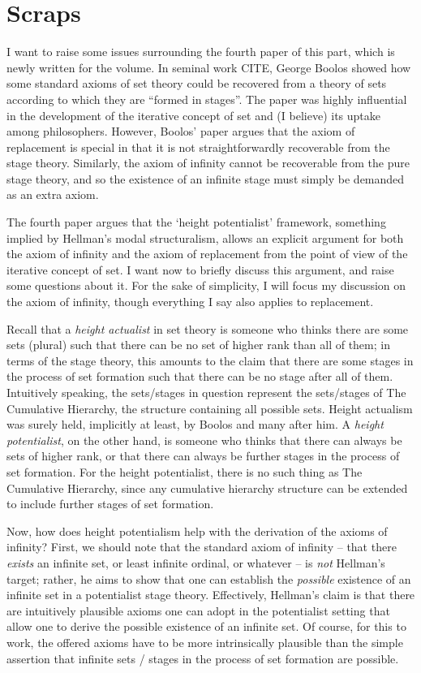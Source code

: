 \documentclass{asl}
\theoremstyle{definition}
\begin{document}
\section{Scraps}
I want to raise some issues surrounding 
the fourth paper of this part, 
which is newly written for the volume. 
In seminal work CITE, George Boolos showed 
how some standard axioms of set theory could 
be recovered from a theory of sets according 
to which they are ``formed in stages''. 
The paper was highly influential in the 
development of the iterative concept of 
set and (I believe) its uptake among philosophers. 
However, Boolos' paper argues that the axiom of 
replacement is special in that it is not 
straightforwardly recoverable from the stage theory. 
Similarly, the axiom of infinity cannot be recoverable 
from the pure stage theory, 
and so the existence of an infinite stage must 
simply be demanded as an extra axiom. 

The fourth paper argues that the `height potentialist' 
framework, something implied by Hellman's modal 
structuralism, allows an explicit argument for both 
the axiom of infinity and the axiom of replacement 
from the point of view of the iterative concept of set. 
I want now to briefly discuss this argument, and raise 
some questions about it. For the sake of simplicity, I 
will focus my discussion on the axiom of infinity, though 
everything I say also applies to replacement.

Recall that a \emph{height actualist} in set theory is 
someone who thinks there are some sets (plural) such that 
there can be no set of higher rank than all of them; in 
terms of the stage theory, this amounts to the claim that 
there are some stages in the process of set formation such 
that there can be no stage after all of them. Intuitively 
speaking, the sets/stages in question represent the 
sets/stages of The Cumulative Hierarchy, the structure 
containing all possible sets. Height actualism was surely 
held, implicitly at least, by Boolos and many after him. 
A \emph{height potentialist}, on the other hand, is 
someone who thinks that there can always be sets of 
higher rank, or that there can always be further 
stages in the process of set formation. For 
the height potentialist, there is no such thing as The 
Cumulative Hierarchy, since any cumulative hierarchy 
structure can be extended to include further stages of 
set formation.

Now, how does height potentialism help with the 
derivation of the axioms of infinity? 
First, we should note that the standard axiom of infinity 
-- that there \emph{exists} an infinite set, or 
least infinite ordinal, or whatever -- is \emph{not} 
Hellman's target; rather, he aims to show that one can 
establish the \emph{possible} existence of an infinite 
set in a potentialist stage theory. Effectively, 
Hellman's claim is that there are intuitively 
plausible axioms one can adopt in the potentialist 
setting that allow one to derive the possible 
existence of an infinite set. Of course, for 
this to work, the offered axioms have to be more 
intrinsically plausible than the simple assertion 
that infinite sets / stages in the process of set 
formation are possible.
\end{document}

